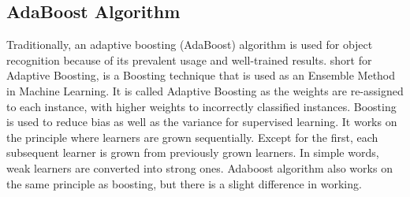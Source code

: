     \subsection{AdaBoost Algorithm}
        Traditionally, an adaptive boosting (AdaBoost) algorithm is used for object recognition because of its prevalent usage and well-trained results. short for Adaptive Boosting, is a Boosting technique that is used as an Ensemble Method in Machine Learning. 
        It is called Adaptive Boosting as the weights are re-assigned to each instance, with higher weights to incorrectly classified instances. Boosting is used to reduce bias as well as the variance for supervised learning. It works on the principle where learners 
        are grown sequentially. Except for the first, each subsequent learner is grown from previously grown learners. In simple words, weak learners are converted into strong ones. Adaboost algorithm also works on the same principle as boosting, but there is a slight 
        difference in working.
